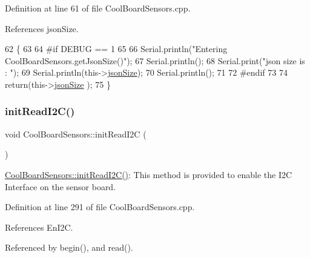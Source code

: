 Definition at line 61 of file Cool\+Board\+Sensors.\+cpp.



References json\+Size.


\begin{DoxyCode}
62 \{
63 
64 \textcolor{preprocessor}{#if DEBUG == 1}
65 
66     Serial.println(\textcolor{stringliteral}{"Entering CoolBoardSensors.getJsonSize()"});
67     Serial.println();
68     Serial.print(\textcolor{stringliteral}{"json size is : "});
69     Serial.println(this->\hyperlink{classCoolBoardSensors_a05a40dc80bfff14ffb830f549b876f8d}{jsonSize});
70     Serial.println();
71 
72 \textcolor{preprocessor}{#endif}
73 
74     \textcolor{keywordflow}{return}(this->\hyperlink{classCoolBoardSensors_a05a40dc80bfff14ffb830f549b876f8d}{jsonSize} );
75 \}
\end{DoxyCode}
\mbox{\label{classCoolBoardSensors_acad6a8418c66d36868caca23c844ecb6}} 
\subsubsection{\texorpdfstring{init\+Read\+I2\+C()}{initReadI2C()}}
{\footnotesize\ttfamily void Cool\+Board\+Sensors\+::init\+Read\+I2C (\begin{DoxyParamCaption}{ }\end{DoxyParamCaption})}

\hyperlink{classCoolBoardSensors_acad6a8418c66d36868caca23c844ecb6}{Cool\+Board\+Sensors\+::init\+Read\+I2\+C()}\+: This method is provided to enable the I2C Interface on the sensor board. 

Definition at line 291 of file Cool\+Board\+Sensors.\+cpp.



References En\+I2C.



Referenced by begin(), and read().


